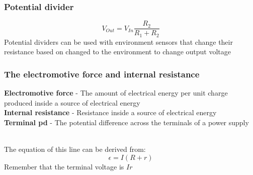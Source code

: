 \documentclass[12pt]{article}
\begin{document}
\subsubsection{Potential divider}
$$V_{Out}=V_{In}\frac{R_2}{R_1+R_2}$$
Potential dividers can be used with environment sensors that change their resistance based on changed to the environment to change output voltage
\subsubsection{The electromotive force and internal resistance}
\textbf{Electromotive force} - The amount of electrical energy per unit charge produced inside a source of electrical energy\\
\textbf{Internal resistance} - Resistance inside a source of electrical energy\\
\textbf{Terminal pd} - The potential difference across the terminals of a power supply\\
\\
The equation of this line can be derived from:
$$\epsilon=I(R+r)$$
Remember that the terminal voltage is $Ir$
\end{document}
